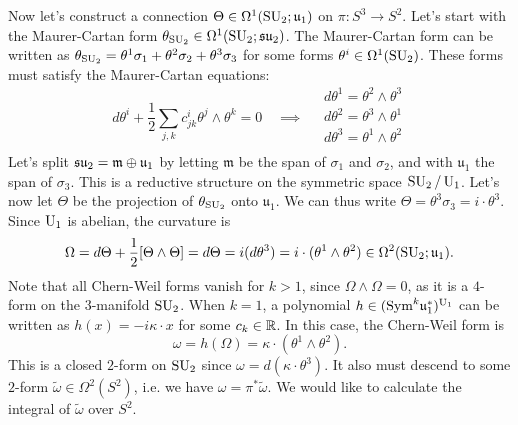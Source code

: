 \documentclass{../../templates/lkx_pset}
\begin{document}
\begin{parts}
	Now let's construct a connection $\Theta\in \Omega^1(\operatorname{SU}_2; \mathfrak{u}_1)$ on $\pi : S^3 \to S^2$. Let's start with the Maurer-Cartan form $\theta_{\operatorname{SU}_2}\in\Omega^1(\operatorname{SU}_2; \mathfrak{su}_2)$. The Maurer-Cartan form can be written as $\theta_{\operatorname{SU}_2} = \theta^1\sigma_1 + \theta^2\sigma_2+\theta^3\sigma_3$ for some forms $\theta^i\in \Omega^1(\operatorname{SU}_2)$. These forms must satisfy the Maurer-Cartan equations:
	\[
		d\theta^i + \frac{1}{2}\sum_{j,k} c^i_{j k} \theta^j\wedge \theta^k = 0 \quad\implies\quad \begin{array}{l}
			d\theta^1 = \theta^2\wedge \theta^3 \\
			d\theta^2 = \theta^3\wedge \theta^1 \\
			d\theta^3 = \theta^1\wedge \theta^2 \\
		\end{array}
	\]
	Let's split $\mathfrak{su}_2 = \mathfrak{m}\oplus \mathfrak{u}_1$ by letting $\mathfrak{m}$ be the span of $\sigma_1$ and $\sigma_2$, and with $\mathfrak{u}_1$ the span of $\sigma_3$. This is a reductive structure on the symmetric space $\operatorname{SU}_2/\operatorname{U}_1$. Let's now let $\Theta$ be the projection of $\theta_{\operatorname{SU}_2}$ onto $\mathfrak{u}_1$. We can thus write $\Theta = \theta^3\sigma_3 = i\cdot \theta^3$. Since $\operatorname{U}_1$ is abelian, the curvature is
	\[
		\Omega = d\Theta + \frac{1}{2}[\Theta\wedge \Theta] = d\Theta = i(d\theta^3) = i\cdot (\theta^1\wedge \theta^2) \in \Omega^2(\operatorname{SU}_2; \mathfrak{u}_1).
	\]
	Note that all Chern-Weil forms vanish for $k>1$, since $\Omega\wedge \Omega=0$, as it is a $4$-form on the $3$-manifold $\operatorname{SU}_2$. When $k=1$, a polynomial $h\in (\textrm{Sym}^k \mathfrak{u}_1^*)^{\operatorname{U}_1}$ can be written as $h(x)=-i\kappa\cdot x$ for some $c_k\in \mathbb{R}$. In this case, the Chern-Weil form is
	\[
		\omega = h(\Omega) = \kappa\cdot(\theta^1\wedge \theta^2).
	\]
	This is a closed $2$-form on $\operatorname{SU}_2$ since $\omega = d(\kappa\cdot \theta^3)$. It also must descend to some $2$-form $\widetilde{\omega}\in \Omega^2(S^2)$, i.e. we have $\omega=\pi^*\widetilde{\omega}$. We would like to calculate the integral of $\widetilde{\omega}$ over $S^2$.


\end{parts}
\end{document}
